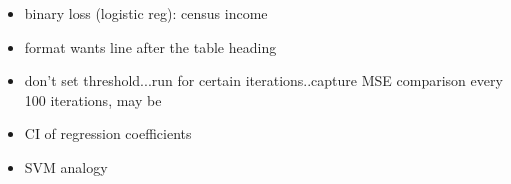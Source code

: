 \documentclass{article}
\begin{document}
\begin{itemize}
    \item binary loss (logistic reg): census income
    \item format wants line after the table heading
    \item don't set threshold...run for certain iterations..capture MSE comparison every 100 iterations, may be
    \item CI of regression coefficients
    \item SVM analogy
\end{itemize}


\end{document}
